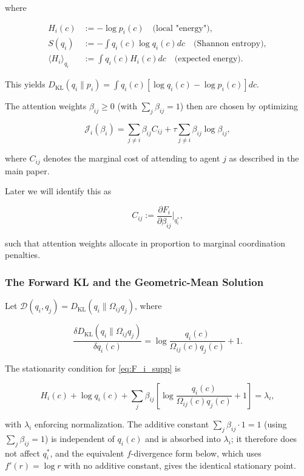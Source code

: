 \documentclass[twoside,11pt]{article}
\begin{document}
where

\begin{align}
H_i(c) &:= -\log p_i(c) \quad \text{(local "energy")}, \\
S(q_i) &:= -\int q_i(c) \log q_i(c) dc \quad \text{(Shannon entropy)}, \\
\langle H_i \rangle_{q_i} &:= \int q_i(c) H_i(c) dc \quad \text{(expected energy)}.
\end{align}

This yields $D_{\mathrm{KL}}(q_i \| p_i) = \int q_i(c)[\log q_i(c) - \log p_i(c)] dc$.

The attention weights $\beta_{ij}\ge 0$ (with $\sum_j \beta_{ij}=1$) then are chosen by optimizing

\begin{equation}
\mathcal{J}_i(\beta_i)
=\sum_{j\neq i}\beta_{ij} C_{ij}
+ \tau \sum_{j\neq i}\beta_{ij}\log\beta_{ij},
\label{eq:J_i_supp}
\end{equation}

where $C_{ij}$ denotes the marginal cost of attending to agent $j$ as described in the main paper.

Later we will identify this as

\begin{equation}
C_{ij} := \frac{\partial F_i}{\partial \beta_{ij}}\Big|_{q_i^*},
\end{equation}

such that attention weights allocate in proportion to marginal coordination penalties.

\subsubsection{The Forward KL and the Geometric-Mean Solution}
Let $\mathcal{D}(q_i,q_j) = D_{\mathrm{KL}}(q_i \| \Omega_{ij} q_j)$, where

\[
\frac{\delta D_{\mathrm{KL}}(q_i \| \Omega_{ij} q_j)}{\delta q_i(c)}
= \log\frac{q_i(c)}{\Omega_{ij}(c) q_j(c)} + 1.
\]

The stationarity condition for \eqref{eq:F_i_supp} is

\begin{equation}
H_i(c)
+ \log q_i(c)
+ \sum_j \beta_{ij}
 \left[
\log\frac{q_i(c)}{\Omega_{ij}(c)q_j(c)}+1
\right]
= \lambda_i,
\end{equation}

with $\lambda_i$ enforcing normalization. The additive constant $\sum_j \beta_{ij} \cdot 1 = 1$ (using $\sum_j \beta_{ij} = 1$) is independent of $q_i(c)$ and is absorbed into $\lambda_i$; it therefore does not affect $q_i^*$, and the equivalent $f$-divergence form below, which uses $f'(r) = \log r$ with no additive constant, gives the identical stationary point.
\end{document}
